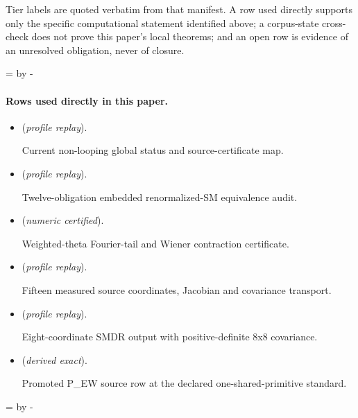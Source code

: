 \documentclass[11pt]{article}
\begin{document}
Tier labels are quoted verbatim from that manifest. A row used directly supports only the specific computational statement identified above; a corpus-state cross-check does not prove this paper's local theorems; and an open row is evidence of an unresolved obligation, never of closure.

\par\begingroup{}=\pagegoal\advance{} by -\pagetotal\ifdim\dimen0<7\baselineskip\newpage\fi\endgroup
\paragraph{Rows used directly in this paper.}
\begin{itemize}
\setlength{\itemsep}{0.25em}
\item {} (\emph{profile replay}).\par Current non-looping global status and source-certificate map.
\item {} (\emph{profile replay}).\par Twelve-obligation embedded renormalized-SM equivalence audit.
\item {} (\emph{numeric certified}).\par Weighted-theta Fourier-tail and Wiener contraction certificate.
\item {} (\emph{profile replay}).\par Fifteen measured source coordinates, Jacobian and covariance transport.
\item {} (\emph{profile replay}).\par Eight-coordinate SMDR output with positive-definite 8x8 covariance.
\item {} (\emph{derived exact}).\par Promoted P\_EW source row at the declared one-shared-primitive standard.
\end{itemize}

\par\begingroup{}=\pagegoal\advance{} by -\pagetotal\ifdim\dimen0<7\baselineskip\newpage\fi\endgroup
\end{document}
